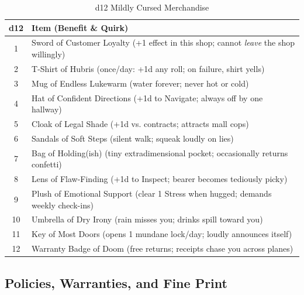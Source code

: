 \begin{table}[h]
\centering
\caption{d12 Mildly Cursed Merchandise}
\label{tab:cursed}
\begin{tabular}{@{}cl@{}}
\toprule
d12 & Item (Benefit \& Quirk) \\
\midrule
1 & Sword of Customer Loyalty (+1 effect in this shop; cannot \emph{leave} the shop willingly) \\
2 & T-Shirt of Hubris (once/day: +1d any roll; on failure, shirt yells) \\
3 & Mug of Endless Lukewarm (water forever; never hot or cold) \\
4 & Hat of Confident Directions (+1d to Navigate; always off by one hallway) \\
5 & Cloak of Legal Shade (+1d vs. contracts; attracts mall cops) \\
6 & Sandals of Soft Steps (silent walk; squeak loudly on lies) \\
7 & Bag of Holding(ish) (tiny extradimensional pocket; occasionally returns confetti) \\
8 & Lens of Flaw-Finding (+1d to Inspect; bearer becomes tediously picky) \\
9 & Plush of Emotional Support (clear 1 Stress when hugged; demands weekly check-ins) \\
10 & Umbrella of Dry Irony (rain misses you; drinks spill toward you) \\
11 & Key of Most Doors (opens 1 mundane lock/day; loudly announces itself) \\
12 & Warranty Badge of Doom (free returns; receipts chase you across planes) \\
\bottomrule
\end{tabular}
\end{table}

\subsection{Policies, Warranties, and Fine Print}

